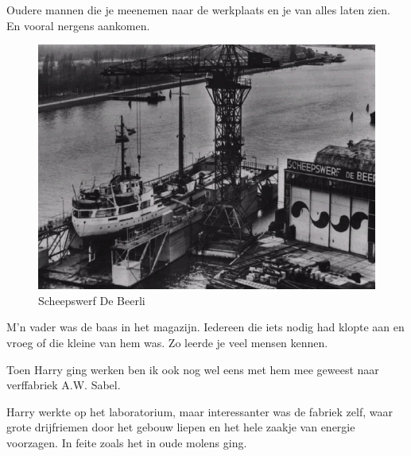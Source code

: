 \documentclass[10pt,twoside, openright]{memoir}
\begin{document}
Oudere mannen die je meenemen naar de werkplaats en je van alles laten zien. En vooral nergens aankomen. 

\begin{figure}
\includegraphics[width=\textwidth]{img/ch32/DeBeer}
\caption*{\footnotesize Scheepswerf De Beerli}
\end{figure}

M’n vader was de baas in het magazijn. Iedereen die iets nodig had klopte aan en vroeg of die kleine van hem was. Zo leerde je veel mensen kennen. 




Toen Harry ging werken ben ik ook nog wel eens met hem mee geweest naar verffabriek A.W. Sabel. 

Harry werkte op het laboratorium, maar interessanter was de fabriek zelf, waar grote drijfriemen door het gebouw liepen en het hele zaakje van energie voorzagen. In feite zoals het in oude molens ging.
\end{document}
